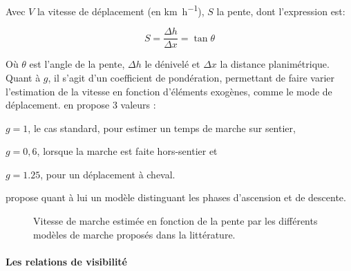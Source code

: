 Avec \(V\) la vitesse de déplacement (en \si{\kilo\meter\per\hour}),
\(S\) la pente, dont l'expression est:

\begin{equation}
 S = \frac{Δh}{Δx} = \tan θ
\end{equation}

Où \(θ\) est l'angle de la pente, \(Δh\) le dénivelé et \(Δx\) la
distance planimétrique. Quant à \(g\), il s'agit d'un coefficient de
pondération, permettant de faire varier l'estimation de la vitesse en
fonction d'éléments exogènes, comme le mode de
déplacement. \textcite{Tobler1993} en propose 3 valeurs :
%
\begin{enumerate*}[label=(\alph*)]
\item \(g = 1\), le cas standard, pour estimer un temps de marche sur
  sentier,
\item \(g = 0,6\), lorsque la marche est faite hors-sentier et
\item  \(g = 1.25\), pour un déplacement à cheval.
\end{enumerate*}
%


\textcite{Kerouanton2020} propose quant à lui un modèle distinguant
les phases d’ascension et de descente.



\begin{figure}
  \centering
  
  \caption{Vitesse de marche estimée en fonction de la pente par les
    différents modèles de marche proposés dans la littérature.}
  \label{fig:modeles_marche}
\end{figure}

\paragraph{Les relations de visibilité}




